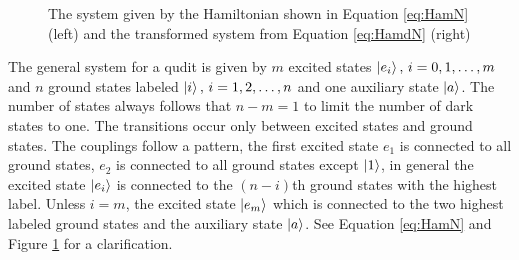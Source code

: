 \begin{figure}[H]
    \caption{The system given by the Hamiltonian shown in Equation \ref{eq:HamN} (left) and the transformed system from Equation \ref{eq:HamdN} (right)}
    \label{fig:HamN}
\end{figure}



The general system for a qudit is given by $m$ excited states $\ket{e_i},\,i = 0,1,\dots,m$ and $n$ ground states labeled $\ket{i},\,i = 1,2,\dots,n$ and one auxiliary state $\ket{a}$. The number of states always follows that $n-m = 1$ to limit the number of dark states to one\cite{lambda}.
The transitions occur only between excited states and ground states. The couplings follow a pattern, the first excited state $e_1$ is connected to all ground states, $e_2$ is connected to all ground states except $\ket{1}$, in general the excited state $\ket{e_i}$ is connected to the $(n - i)$th ground states with the highest label. Unless $i = m$, the excited state $\ket{e_m}$ which is connected to the two highest labeled ground states and the auxiliary state $\ket{a}$. See Equation \ref{eq:HamN} and Figure \ref{fig:HamN} for a clarification. 


